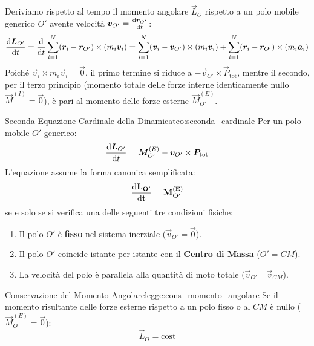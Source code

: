 Deriviamo rispetto al tempo il momento angolare $\vec{L}_O$ rispetto a un polo mobile generico $O'$ avente velocità $\bm{v}_{O'} = \frac{\mathrm{d} \bm{r}_{O'}}{\mathrm{d} t}$:
\begin{equation}
    \frac{\mathrm{d} \bm{L}_{O'}}{\mathrm{d} t} = \frac{\mathrm{d} }{\mathrm{d} t}\sum_{i=1}^N (\bm{r}_i - \bm{r}_{O'}) \times (m_i\bm{v}_i) = \sum_{i=1}^N (\bm{v}_i - \bm{v}_{O'}) \times (m_i\bm{v}_i) + \sum_{i=1}^N (\bm{r}_i - \bm{r}_{O'}) \times (m_i\bm{a}_i)
\end{equation}
Poiché $\vec{v}_i \times m_i\vec{v}_i = \vec{0}$, il primo termine si riduce a $-\vec{v}_{O'} \times \vec{P}_{\text{tot}}$, mentre il secondo, per il terzo principio (momento totale delle forze interne identicamente nullo $\vec{M}^{(I)} = \vec{0}$), è pari al momento delle forze esterne $\vec{M}_{O'}^{(E)}$.

\begin{teorema}{Seconda Equazione Cardinale della Dinamica}{teo:seconda_cardinale}
Per un polo mobile $O'$ generico:
\begin{equation}
    \frac{\mathrm{d} \bm{L}_{O'}}{\mathrm{d} t} = \bm{M}_{O'}^{(E)} - \bm{v}_{O'} \times \bm{P}_{\text{tot}}
    \label{eq:seconda_cardinale_gen}
\end{equation}
L'equazione assume la forma canonica semplificata:
\begin{equation}
    \mathbf{\frac{\mathrm{d} \bm{L}_{O'}}{\mathrm{d} t} = \bm{M}_{O'}^{(E)}}
    \label{eq:seconda_cardinale_canonica}
\end{equation}
se e solo se si verifica una delle seguenti tre condizioni fisiche:
\begin{enumerate}
    \item Il polo $O'$ è \textbf{fisso} nel sistema inerziale ($\vec{v}_{O'} = \vec{0}$).
    \item Il polo $O'$ coincide istante per istante con il \textbf{Centro di Massa} ($O' = CM$).
    \item La velocità del polo è parallela alla quantità di moto totale ($\vec{v}_{O'} \parallel \vec{v}_{CM}$).
\end{enumerate}
\end{teorema}

\begin{legge}{Conservazione del Momento Angolare}{legge:cons_momento_angolare}
Se il momento risultante delle forze esterne rispetto a un polo fisso o al $CM$ è nullo ($\vec{M}_O^{(E)} = \vec{0}$):
\begin{equation}
    \vec{L}_O = \text{cost}
    \label{eq:cons_L}
\end{equation}
\end{legge}

